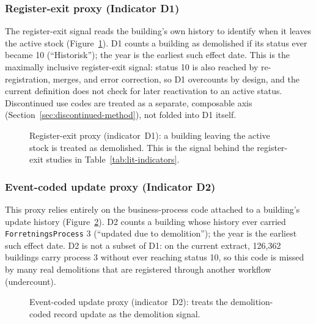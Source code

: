 \subsubsection*{Register-exit proxy (Indicator D1)}

The register-exit signal reads the building's own history to identify
when it leaves the active stock (Figure~\ref{fig:ind-d1}). D1 counts a
building as demolished if its status ever became 10 (``Historisk''); the
year is the earliest such effect date. This is the maximally inclusive
register-exit signal: status 10 is also reached by re-registration,
merges, and error correction, so D1 overcounts by design, and the
current definition does not check for later reactivation to an active
status. Discontinued use codes are treated as a separate, composable
axis (Section~\ref{sec:discontinued-method}), not folded into D1 itself.

\begin{figure}[h!]
\centering
{}
\caption{Register-exit proxy (indicator~D1): a building leaving the
active stock is treated as demolished. This is the signal behind the
register-exit studies in Table~\ref{tab:lit-indicators}.}
\label{fig:ind-d1}
\end{figure}

\subsubsection*{Event-coded update proxy (Indicator D2)}

This proxy relies entirely on the business-process code attached to a
building's update history (Figure~\ref{fig:ind-d2}). D2 counts a building
whose history ever carried \texttt{ForretningsProcess} 3 (``updated due
to demolition''); the year is the earliest such effect date. D2 is not a
subset of D1: on the current extract, 126{,}362 buildings carry process
3 without ever reaching status 10, so this code is missed by many real
demolitions that are registered through another workflow (undercount).

\begin{figure}[h!]
\centering
{}
\caption{Event-coded update proxy (indicator~D2): treats the
demolition-coded record update as the demolition signal.}
\label{fig:ind-d2}
\end{figure}


